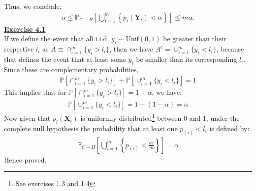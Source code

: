 \documentclass[a4paper, 11pt]{article}
\begin{document}
Thus, we conclude:
\begin{eqnarray}
\alpha \leq \mathbb{P}_{C-H} \left[ \bigcup_{i=1}^{m} \left\{ p_i(\mathbf{Y}_i) < \alpha \right\} \right] \leq m \alpha. \nonumber
\end{eqnarray}
\newpage
\textbf{\underline{Exercise 4.1}}\\
\newline If we define the event that all i.i.d. $y_i \sim\text{Unif}(0, 1)$ be greater than their respective $l_i$ as $A \equiv \cap_{i=1}^{m} \{y_i > l_i \}$, then we have $A^{c} = \cup_{i=1}^{m} \{y_i < l_i \}$, because that defines the event that at least some $y_i$ be smaller than its corresponding $l_i$. Since these are complementary probabilities,
\begin{eqnarray}
\mathbb{P} [ \cap_{i=1}^{m} \{y_i > l_i \} ] + \mathbb{P} [ \cup_{i=1}^{m} \{y_i < l_i \} ]  = 1\nonumber
\end{eqnarray}
This implies that for $\mathbb{P} [ \cap_{i=1}^{m} \{y_i > l_i \} ] = 1-\alpha$, we have:
\begin{eqnarray}
\mathbb{P} [ \cup_{i=1}^{m} \{y_i < l_i \} ] = 1 - (1-\alpha) = \alpha \nonumber
\end{eqnarray}
Now given that $p_i (\mathbf{X}_i)$ is uniformly distributed\footnote{See exercises 1.3 and 1.4} between 0 and 1, under the complete null hypothesis the probability that at least one $p_{(i)} < l_i$ is defined by:
\begin{eqnarray}
\mathbb{P}_{C-H} \left[ \bigcup_{i=1}^{m} \left\{p_{(i)} < \frac{i \alpha}{m} \right\} \right] = \alpha \nonumber
\end{eqnarray}
Hence proved.
\end{document}
